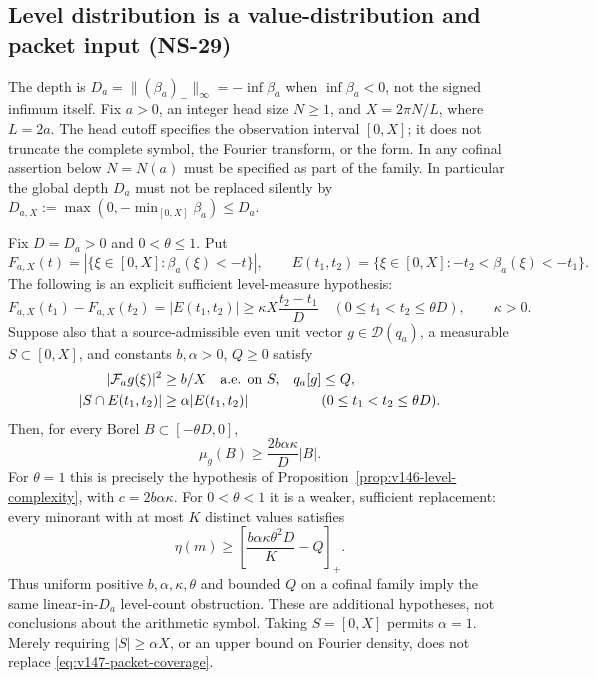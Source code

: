 \subsection*{Level distribution is a value-distribution and packet input (NS-29)}

The depth is $D_a=\| (\beta_a)_-\|_\infty=-\inf\beta_a$ when
$\inf\beta_a<0$, not the signed infimum itself. Fix $a>0$, an integer
head size $N\ge1$, and $X=2\pi N/L$, where $L=2a$. The head cutoff
specifies the observation interval $[0,X]$; it does not truncate the
complete symbol, the Fourier transform, or the form. In any cofinal
assertion below $N=N(a)$ must be specified as part of the family.
In particular the global depth $D_a$ must not be replaced silently by
$D_{a,X}:=\max(0,-\min_{[0,X]}\beta_a)\le D_a$.

\begin{proposition}
\label{prop:v147-level-separation}
Fix $D=D_a>0$ and $0<\theta\le1$. Put
\[
 F_{a,X}(t)=|\{\xi\in[0,X]:\beta_a(\xi)<-t\}|,
 \qquad E(t_1,t_2)=\{\xi\in[0,X]:-t_2<\beta_a(\xi)<-t_1\}.
\]
The following is an explicit sufficient level-measure hypothesis:
\begin{equation}\label{eq:v147-level-increments}
 F_{a,X}(t_1)-F_{a,X}(t_2)
 =|E(t_1,t_2)|\ge\kappa X\frac{t_2-t_1}{D}
 \quad(0\le t_1<t_2\le\theta D),\qquad\kappa>0.
\end{equation}
Suppose also that a source-admissible even unit vector
$g\in\mathcal D(q_a)$, a measurable $S\subset[0,X]$, and constants
$b,\alpha>0$, $Q\ge0$ satisfy
\begin{align}
 |\mathcal F_ag(\xi)|^2&\ge b/X\quad\hbox{a.e. on }S,
 &q_a[g]&\le Q, \notag\\
 |S\cap E(t_1,t_2)|&\ge\alpha|E(t_1,t_2)|
 &&(0\le t_1<t_2\le\theta D).
 \label{eq:v147-packet-coverage}
\end{align}
Then, for every Borel $B\subset[-\theta D,0]$,
\begin{equation}\label{eq:v147-weighted-density}
 \mu_g(B)\ge\frac{2b\alpha\kappa}{D}|B|.
\end{equation}
For $\theta=1$ this is precisely the hypothesis of
Proposition~\ref{prop:v146-level-complexity}, with $c=2b\alpha\kappa$.
For $0<\theta<1$ it is a weaker, sufficient replacement: every minorant
with at most $K$ distinct values satisfies
\begin{equation}\label{eq:v147-partial-level-loss}
 \eta(m)\ge\left[\frac{b\alpha\kappa\theta^2D}{K}-Q\right]_+.
\end{equation}
Thus uniform positive $b,\alpha,\kappa,\theta$ and bounded $Q$ on a
cofinal family imply the same linear-in-$D_a$ level-count obstruction.
These are additional hypotheses, not conclusions about the arithmetic
symbol. Taking $S=[0,X]$ permits $\alpha=1$. Merely requiring
$|S|\ge\alpha X$, or an upper bound on Fourier density, does not
replace \eqref{eq:v147-packet-coverage}.
\end{proposition}
